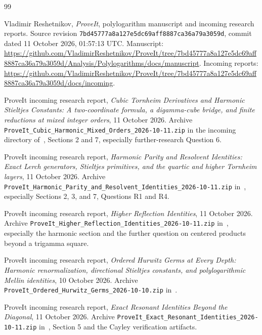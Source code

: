 \documentclass[11pt,a4paper]{article}
\numberwithin{equation}{section}
\theoremstyle{definition}
\theoremstyle{remark}
\newcommand{\snapshot}{\texttt{7bd45777a8a127e5dc69aff8887ca36a79a3059d}}
\begin{document}
\clearpage
{}
{}
\begingroup\small
\begin{thebibliography}{99}

Vladimir Reshetnikov, \emph{ProveIt}, polylogarithm manuscript and
incoming research reports. Source revision
\snapshot, commit dated 11 October 2026, 01:57:13 UTC.
Manuscript:
\url{https://github.com/VladimirReshetnikov/ProveIt/tree/7bd45777a8a127e5dc69aff8887ca36a79a3059d/Analysis/Polylogarithms/docs/manuscript}.
Incoming reports:
\url{https://github.com/VladimirReshetnikov/ProveIt/tree/7bd45777a8a127e5dc69aff8887ca36a79a3059d/docs/incoming}.

ProveIt incoming research report,
\emph{Cubic Tornheim Derivatives and Harmonic Stieltjes Constants:
A two-coordinate formula, a digamma-cube bridge, and finite reductions
at mixed integer orders}, 11 October 2026.
Archive \nolinkurl{ProveIt_Cubic_Harmonic_Mixed_Orders_2026-10-11.zip}
in the incoming directory of~\cite{ProveIt}, Sections 2 and 7,
especially further-research Question 6.

ProveIt incoming research report,
\emph{Harmonic Parity and Resolvent Identities:
Exact Lerch generators, Stieltjes primitives, and the quartic and higher
Tornheim layers}, 11 October 2026.
Archive
\nolinkurl{ProveIt_Harmonic_Parity_and_Resolvent_Identities_2026-10-11.zip}
in~\cite{ProveIt}, especially Sections 2, 3, and 7, Questions R1 and R4.

ProveIt incoming research report,
\emph{Higher Reflection Identities}, 11 October 2026.
Archive \nolinkurl{ProveIt_Higher_Reflection_Identities_2026-10-11.zip}
in~\cite{ProveIt}, especially the harmonic section and the further
question on centered products beyond a trigamma square.

ProveIt incoming research report,
\emph{Ordered Hurwitz Germs at Every Depth:
Harmonic renormalization, directional Stieltjes constants, and
polylogarithmic Mellin identities}, 10 October 2026.
Archive \nolinkurl{ProveIt_Ordered_Hurwitz_Germs_2026-10-10.zip}
in~\cite{ProveIt}.

ProveIt incoming research report,
\emph{Exact Resonant Identities Beyond the Diagonal},
11 October 2026.
Archive \nolinkurl{ProveIt_Exact_Resonant_Identities_2026-10-11.zip}
in~\cite{ProveIt}, Section 5 and the Cayley verification artifacts.


\end{thebibliography}
\end{document}
